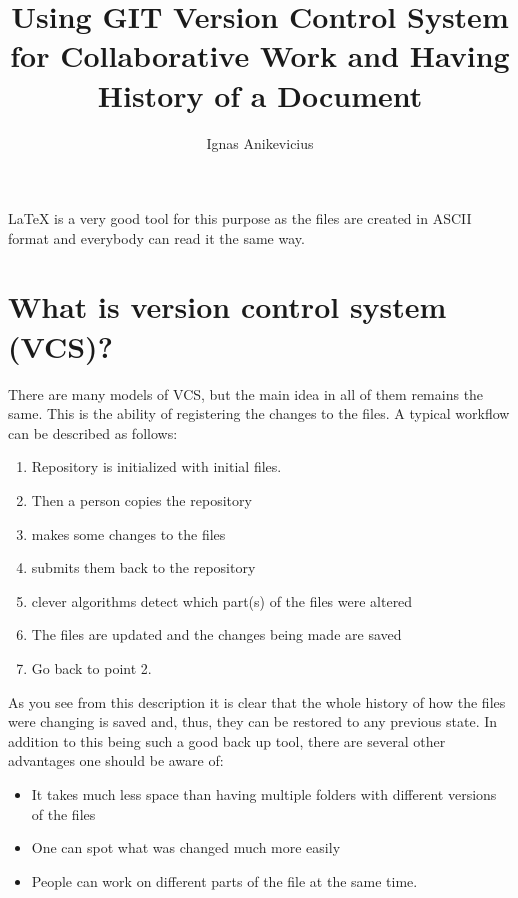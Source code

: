 \documentclass[
]{scrartcl}
\title{Using GIT Version Control System for Collaborative Work and Having
History of a Document}
\author{Ignas Anikevicius}
\begin{document}
\maketitle
\tableofcontents
\listoftodos{\vskip 1em}

%
\LaTeX{} is a very good tool for this purpose as the files are created in ASCII
    format and everybody can read it the same way.

\section{What is version control system (VCS)?}

%
There are many models of VCS, but the main idea in all of them remains the same.
%
This is the ability of registering the changes to the files. 
%
A typical workflow can be described as follows:
\begin{enumerate}
    \item Repository is initialized with initial files.
    \item Then a person copies the repository
    \item makes some changes to the files
    \item submits them back to the repository 
    \item clever algorithms detect  which part(s) of the files were altered 
    \item The files are updated and the changes being made are saved
    \item Go back to point 2.
\end{enumerate}

%
As you see from this description it is clear that the whole history of how the
    files were changing is saved and, thus, they can be restored to any previous
    state.
%
In addition to this being such a good back up tool, there are several
    other advantages one should be aware of:
%
\begin{itemize}
    \item It takes much less space than having multiple folders with different
        versions of the files
    \item One can spot what was changed much more easily
    \item People can work on different parts of the file at the same time.
\end{itemize}
\end{document}
